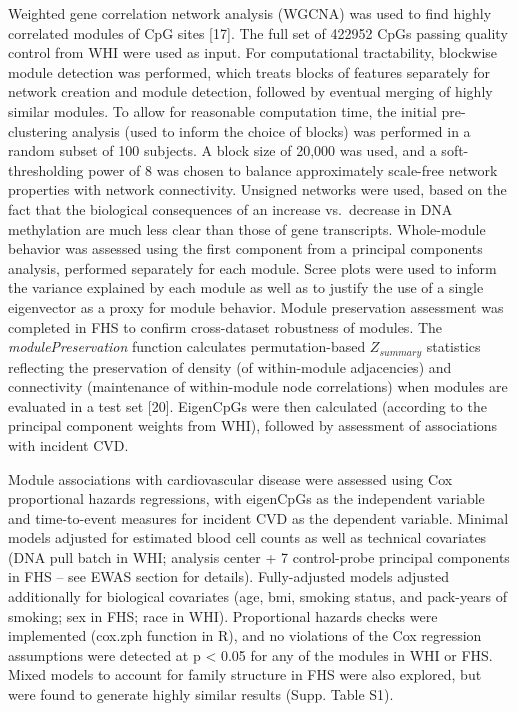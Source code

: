 \documentclass[]{article}
\theoremstyle{definition}
\theoremstyle{definition}
\theoremstyle{definition}
\theoremstyle{remark}
\begin{document}
Weighted gene correlation network analysis (WGCNA) was used to find
highly correlated modules of CpG sites {[}17{]}. The full set of 422952
CpGs passing quality control from WHI were used as input. For
computational tractability, blockwise module detection was performed,
which treats blocks of features separately for network creation and
module detection, followed by eventual merging of highly similar
modules. To allow for reasonable computation time, the initial
pre-clustering analysis (used to inform the choice of blocks) was
performed in a random subset of 100 subjects. A block size of 20,000 was
used, and a soft-thresholding power of 8 was chosen to balance
approximately scale-free network properties with network connectivity.
Unsigned networks were used, based on the fact that the biological
consequences of an increase vs.~decrease in DNA methylation are much
less clear than those of gene transcripts. Whole-module behavior was
assessed using the first component from a principal components analysis,
performed separately for each module. Scree plots were used to inform
the variance explained by each module as well as to justify the use of a
single eigenvector as a proxy for module behavior. Module preservation
assessment was completed in FHS to confirm cross-dataset robustness of
modules. The \emph{modulePreservation} function calculates
permutation-based \(Z_{summary}\) statistics reflecting the preservation
of density (of within-module adjacencies) and connectivity (maintenance
of within-module node correlations) when modules are evaluated in a test
set {[}20{]}. EigenCpGs were then calculated (according to the principal
component weights from WHI), followed by assessment of associations with
incident CVD.

Module associations with cardiovascular disease were assessed using Cox
proportional hazards regressions, with eigenCpGs as the independent
variable and time-to-event measures for incident CVD as the dependent
variable. Minimal models adjusted for estimated blood cell counts as
well as technical covariates (DNA pull batch in WHI; analysis center + 7
control-probe principal components in FHS -- see EWAS section for
details). Fully-adjusted models adjusted additionally for biological
covariates (age, bmi, smoking status, and pack-years of smoking; sex in
FHS; race in WHI). Proportional hazards checks were implemented (cox.zph
function in R), and no violations of the Cox regression assumptions were
detected at p \textless{} 0.05 for any of the modules in WHI or FHS.
Mixed models to account for family structure in FHS were also explored,
but were found to generate highly similar results (Supp. Table S1).
\end{document}
